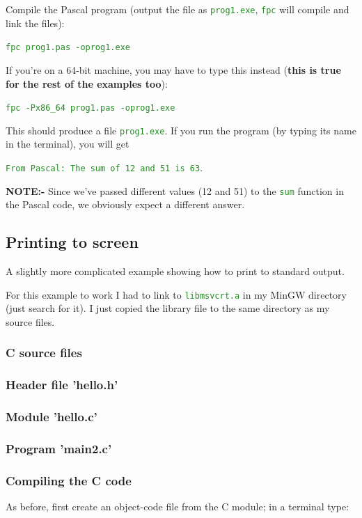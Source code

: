 \documentclass[10pt,a4paper]{article}
\newcommand{\mytext}[1]{\textcolor{ForestGreen}{\texttt{#1}}}
\begin{document}
Compile the Pascal program (output the file as \mytext{prog1.exe}, \mytext{fpc} will compile and link the files):

\mytext{fpc prog1.pas -oprog1.exe}

If you're on a 64-bit machine, you may have to type this instead (\textbf{this is
true for the rest of the examples too}):

\mytext{fpc -Px86\_64 prog1.pas -oprog1.exe}

This should produce a file \mytext{prog1.exe}. If you run the program (by typing its name in the terminal), you will get

\mytext{From Pascal: The sum of 12 and 51 is 63}.

\textbf{NOTE:-} Since we've passed different values (12 and 51) to the \mytext{sum} function in the Pascal code, we obviously expect a different answer.
\clearpage


\subsection{Printing to screen}
A slightly more complicated example showing how to print to standard output.

For this example to work I had to link to \mytext{libmsvcrt.a} in my MinGW
 directory (just search for it). I just copied the library file to the same
  directory as my source files.

\subsubsection{C source files}
\lstset{style=myC}

\subsubsection*{Header file 'hello.h'}


\subsubsection*{Module 'hello.c'}


\newpage
\subsubsection*{Program 'main2.c'}


\subsubsection*{Compiling the C code}
As before, first create an object-code file from the C module; in a terminal  type:
\end{document}
